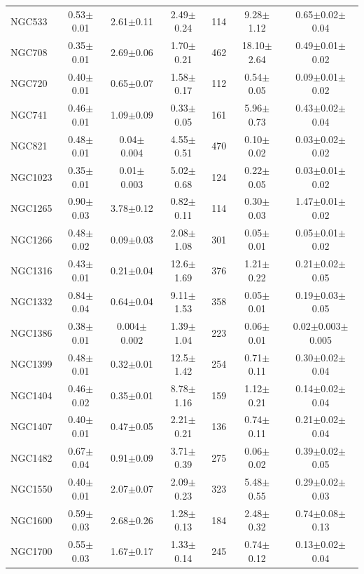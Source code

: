 \documentclass[iop]{emulateapj}
\begin{document}
\begin{table}
\begin{tabular}{lcccccc}
NGC533  & 0.53$\pm$0.01 & 2.61$\pm$0.11 & 2.49$\pm$0.24 & 114 & 9.28$\pm$1.12 & 0.65$\pm$0.02$\pm$0.04   \\
NGC708  & 0.35$\pm$0.01 & 2.69$\pm$0.06 & 1.70$\pm$0.21 & 462 & 18.10$\pm$2.64 & 0.49$\pm$0.01$\pm$0.02    \\
NGC720  & 0.40$\pm$0.01 & 0.65$\pm$0.07 & 1.58$\pm$0.17 & 112 & 0.54$\pm$0.05 & 0.09$\pm$0.01$\pm$0.02   \\
NGC741  & 0.46$\pm$0.01 & 1.09$\pm$0.09 & 0.33$\pm$0.05 & 161 & 5.96$\pm$0.73 & 0.43$\pm$0.02$\pm$0.04   \\
NGC821  & 0.48$\pm$0.01 & 0.04$\pm$0.004 & 4.55$\pm$0.51 & 470 & 0.10$\pm$0.02 & 0.03$\pm$0.02$\pm$0.02   \\
NGC1023 & 0.35$\pm$0.01 & 0.01$\pm$0.003 & 5.02$\pm$0.68 & 124 & 0.22$\pm$0.05 & 0.03$\pm$0.01$\pm$0.02 \\
NGC1265 & 0.90$\pm$0.03 & 3.78$\pm$0.12 & 0.82$\pm$0.11 & 114  & 0.30$\pm$0.03 & 1.47$\pm$0.01$\pm$0.02   \\
NGC1266 & 0.48$\pm$0.02 & 0.09$\pm$0.03 & 2.08$\pm$1.08 & 301 & 0.05$\pm$0.01 & 0.05$\pm$0.01$\pm$0.02 \\
NGC1316 & 0.43$\pm$0.01 & 0.21$\pm$0.04 & 12.6$\pm$1.69  & 376 & 1.21$\pm$0.22 & 0.21$\pm$0.02$\pm$0.05   \\
NGC1332 & 0.84$\pm$0.04 & 0.64$\pm$0.04 & 9.11$\pm$1.53  & 358  & 0.05$\pm$0.01  & 0.19$\pm$0.03$\pm$0.05  \\
NGC1386 & 0.38$\pm$0.01 & 0.004$\pm$0.002 & 1.39$\pm$1.04 & 223  & 0.06$\pm$0.01  & 0.02$\pm$0.003$\pm$0.005 \\
NGC1399 & 0.48$\pm$0.01 & 0.32$\pm$0.01 & 12.5$\pm$1.42  & 254  & 0.71$\pm$0.11  & 0.30$\pm$0.02$\pm$0.04   \\
NGC1404 & 0.46$\pm$0.02 & 0.35$\pm$0.01 & 8.78$\pm$1.16 & 159  & 1.12$\pm$0.21 & 0.14$\pm$0.02$\pm$0.04    \\
NGC1407 & 0.40$\pm$0.01 & 0.47$\pm$0.05 & 2.21$\pm$0.21 & 136  & 0.74$\pm$0.11  & 0.21$\pm$0.02$\pm$0.04   \\
NGC1482 & 0.67$\pm$0.04 & 0.91$\pm$0.09 & 3.71$\pm$0.39  & 275 & 0.06$\pm$0.02 & 0.39$\pm$0.02$\pm$0.05   \\
NGC1550 & 0.40$\pm$0.01 & 2.07$\pm$0.07 & 2.09$\pm$0.23 & 323 & 5.48$\pm$0.55 & 0.29$\pm$0.02$\pm$0.03 \\
NGC1600 & 0.59$\pm$0.03 & 2.68$\pm$0.26 & 1.28$\pm$0.13  & 184  & 2.48$\pm$0.32  & 0.74$\pm$0.08$\pm$0.13   \\ 
NGC1700 & 0.55$\pm$0.03 & 1.67$\pm$0.17 & 1.33$\pm$0.14  & 245  & 0.74$\pm$0.12  & 0.13$\pm$0.02$\pm$0.04    \\

\end{tabular}
\end{table}
\end{document}
